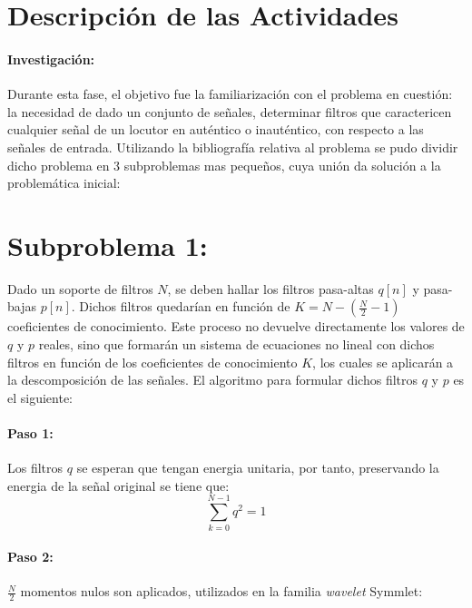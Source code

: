 \documentclass[11pt]{article}
\begin{document}
\clearpage

\section*{Descripción de las Actividades}
\paragraph*{Investigación:}
Durante esta fase, el objetivo fue la familiarización con el problema en cuestión: la necesidad de dado un conjunto de señales, determinar filtros que caractericen 
cualquier señal de un locutor en auténtico o inauténtico, con respecto a las señales de entrada. Utilizando la bibliografía relativa al problema se pudo dividir dicho problema en 
3 subproblemas mas pequeños, cuya unión da solución a la problemática inicial:

\section*{Subproblema 1:}
Dado un soporte de filtros \(N\), se deben hallar los filtros pasa-altas \(q[n]\) y pasa-bajas \(p[n]\). Dichos filtros quedarían en función 
de \(K = N - (\frac{N}{2} - 1)\) coeficientes de conocimiento. Este proceso no devuelve directamente los valores de \(q\) y \(p\) reales, sino que formarán un sistema de 
ecuaciones no lineal con dichos filtros en función de los coeficientes de conocimiento \(K\), los cuales se aplicarán a la descomposición de las señales. El algoritmo 
para formular dichos filtros \(q\) y \(p\) es el siguiente:


\paragraph*{Paso 1:}
Los filtros \(q\) se esperan que tengan energia unitaria, por tanto, preservando la energia de la señal original se tiene que:
\begin{equation}
    \sum_{k=0}^{N - 1} q^2 = 1
\end{equation}

\paragraph*{Paso 2:}
\(\frac{N}{2}\) momentos nulos son aplicados, utilizados en la familia {\it wavelet} Symmlet:
\end{document}

